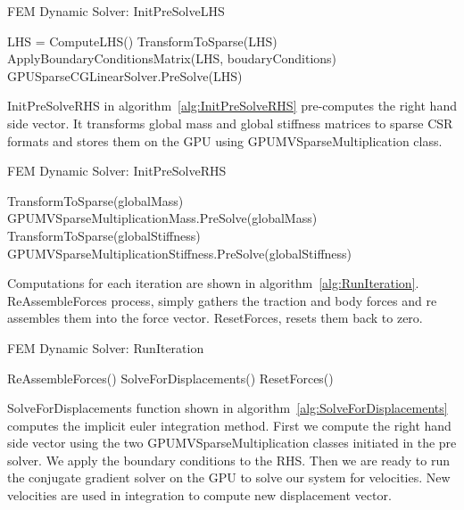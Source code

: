 \documentclass[en]{minipw} %
\begin{document}
\begin{algorithm}
\caption{FEM Dynamic Solver: InitPreSolveLHS}
\label{alg:InitPreSolveLHS}
\begin{algorithmic}[1]
\State LHS = ComputeLHS()
\State TransformToSparse(LHS)
\State ApplyBoundaryConditionsMatrix(LHS, boudaryConditions)
\State GPUSparseCGLinearSolver.PreSolve(LHS)
\EndProcedure
\end{algorithmic}
\end{algorithm}

InitPreSolveRHS in algorithm~\ref{alg:InitPreSolveRHS} pre-computes the right hand side vector. It transforms global mass and global stiffness matrices to sparse CSR formats and stores them on the GPU using GPUMVSparseMultiplication class.

\begin{algorithm}
\caption{FEM Dynamic Solver: InitPreSolveRHS}
\label{alg:InitPreSolveRHS}
\begin{algorithmic}[1]
\State TransformToSparse(globalMass)
\State GPUMVSparseMultiplicationMass.PreSolve(globalMass)
\State TransformToSparse(globalStiffness)
\State GPUMVSparseMultiplicationStiffness.PreSolve(globalStiffness)
\EndProcedure
\end{algorithmic}
\end{algorithm}

Computations for each iteration are shown in algorithm~\ref{alg:RunIteration}. ReAssembleForces process, simply gathers the traction and body forces and re assembles them into the force vector. ResetForces, resets them back to zero.

\begin{algorithm}
\caption{FEM Dynamic Solver: RunIteration}
\label{alg:RunIteration}
\begin{algorithmic}[1]
\State ReAssembleForces()
\State SolveForDisplacements()
\State ResetForces()
\EndProcedure
\end{algorithmic}
\end{algorithm}

SolveForDisplacements function shown in algorithm~\ref{alg:SolveForDisplacements} computes the implicit euler integration method. First we compute the right hand side vector using the two GPUMVSparseMultiplication classes initiated in the pre solver. We apply the boundary conditions to the RHS. Then we are ready to run the conjugate gradient solver on the GPU to solve our system for velocities. New velocities are used in integration to compute new displacement vector.
\end{document}
